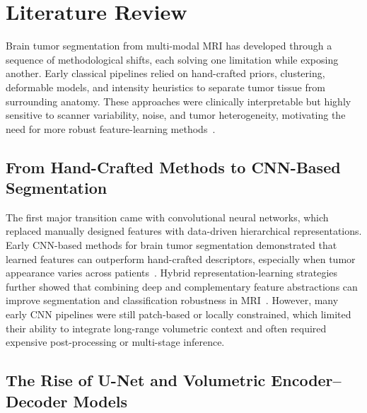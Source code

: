 \documentclass[conference]{IEEEtran}
\begin{document}
\section{Literature Review}
\label{sec:lit}

Brain tumor segmentation from multi-modal MRI has developed through a sequence of methodological shifts, each solving one limitation while exposing another. Early classical pipelines relied on hand-crafted priors, clustering, deformable models, and intensity heuristics to separate tumor tissue from surrounding anatomy. These approaches were clinically interpretable but highly sensitive to scanner variability, noise, and tumor heterogeneity, motivating the need for more robust feature-learning methods~\cite{gordillo2013survey}.

\subsection{From Hand-Crafted Methods to CNN-Based Segmentation}

The first major transition came with convolutional neural networks, which replaced manually designed features with data-driven hierarchical representations. Early CNN-based methods for brain tumor segmentation demonstrated that learned features can outperform hand-crafted descriptors, especially when tumor appearance varies across patients~\cite{havaei2017brainseg}. Hybrid representation-learning strategies further showed that combining deep and complementary feature abstractions can improve segmentation and classification robustness in MRI~\cite{farajzadeh2023hybrid}. However, many early CNN pipelines were still patch-based or locally constrained, which limited their ability to integrate long-range volumetric context and often required expensive post-processing or multi-stage inference.

\subsection{The Rise of U-Net and Volumetric Encoder--Decoder Models}
\end{document}
